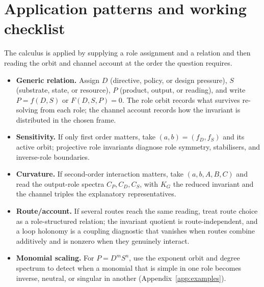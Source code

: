 \documentclass[11pt]{article}
\theoremstyle{plain}
\theoremstyle{definition}
\newcommand{\KG}{K_{G}}
\begin{document}
\section{Application patterns and working checklist}
\label{app:patterns}

The calculus is applied by supplying a role assignment and a relation and then reading the orbit and
channel account at the order the question requires.
\begin{itemize}[itemsep=2pt,topsep=2pt]
\item \textbf{Generic relation.} Assign $D$ (directive, policy, or design pressure), $S$ (substrate,
state, or resource), $P$ (product, output, or reading), and write $P=f(D,S)$ or $F(D,S,P)=0$. The role
orbit records what survives re-solving from each role; the channel account records how the invariant
is distributed in the chosen frame.
\item \textbf{Sensitivity.} If only first order matters, take $(a,b)=(f_D,f_S)$ and its active orbit;
projective role invariants diagnose role symmetry, stabilisers, and inverse-role boundaries.
\item \textbf{Curvature.} If second-order interaction matters, take $(a,b,A,B,C)$ and read the
output-role spectra $C_P,C_D,C_S$, with $\KG$ the reduced invariant and the channel triples the
explanatory representatives.
\item \textbf{Route/account.} If several routes reach the same reading, treat route choice as a
role-structured relation; the invariant quotient is route-independent, and a loop holonomy is a
coupling diagnostic that vanishes when routes combine additively and is nonzero when they genuinely
interact.
\item \textbf{Monomial scaling.} For $P=D^mS^n$, use the exponent orbit and degree spectrum to detect
when a monomial that is simple in one role becomes inverse, neutral, or singular in another
(Appendix~\ref{app:examples}).
\end{itemize}
\end{document}
